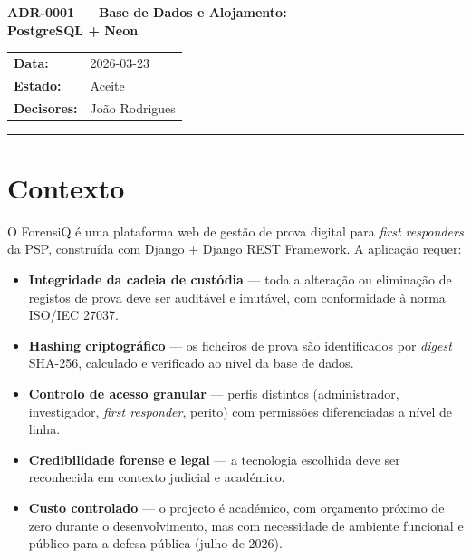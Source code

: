 \documentclass[a4paper,11pt]{article}
\begin{document}

\begin{center}
    {\LARGE\bfseries ADR-0001 --- Base de Dados e Alojamento:\\[0.3em]
    PostgreSQL + Neon}\\[1.2em]
    \begin{tabular}{ll}
        \textbf{Data:}       & 2026-03-23 \\
        \textbf{Estado:}     & Aceite \\
        \textbf{Decisores:}  & João Rodrigues \\
    \end{tabular}
\end{center}

\vspace{0.5em}
\hrule
\vspace{1.5em}

\section{Contexto}

O ForensiQ é uma plataforma web de gestão de prova digital para \emph{first
responders} da PSP, construída com Django + Django REST Framework. A aplicação
requer:

\begin{itemize}[nosep, leftmargin=*]
    \item \textbf{Integridade da cadeia de custódia} --- toda a alteração ou
    eliminação de registos de prova deve ser auditável e imutável, com
    conformidade à norma ISO/IEC 27037.

    \item \textbf{Hashing criptográfico} --- os ficheiros de prova são
    identificados por \emph{digest} SHA-256, calculado e verificado ao nível
    da base de dados.

    \item \textbf{Controlo de acesso granular} --- perfis distintos
    (administrador, investigador, \emph{first responder}, perito) com
    permissões diferenciadas a nível de linha.

    \item \textbf{Credibilidade forense e legal} --- a tecnologia escolhida
    deve ser reconhecida em contexto judicial e académico.

    \item \textbf{Custo controlado} --- o projecto é académico, com orçamento
    próximo de zero durante o desenvolvimento, mas com necessidade de ambiente
    funcional e público para a defesa pública (julho de 2026).
\end{itemize}
\end{document}
